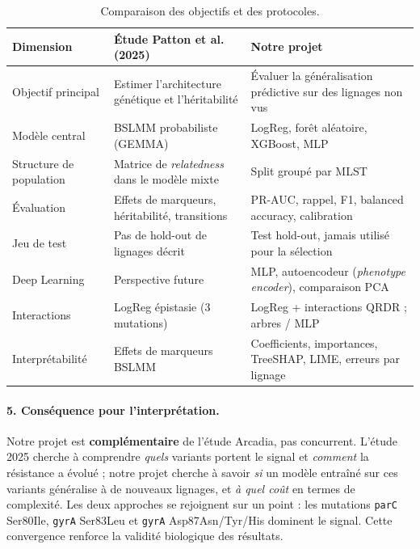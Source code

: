 \documentclass[11pt,a4paper]{article}
\begin{document}
\begin{table}[H]
\centering
\caption{Comparaison des objectifs et des protocoles.}
\label{tab:comparison_arcadia}
\small
\begin{tabularx}{\textwidth}{lXX}
\toprule
\textbf{Dimension} & \textbf{Étude Patton et al. (2025)} & \textbf{Notre projet} \\
\midrule
Objectif principal & Estimer l'architecture génétique et l'héritabilité & Évaluer la généralisation prédictive sur des lignages non vus \\
Modèle central & BSLMM probabiliste (GEMMA) & LogReg, forêt aléatoire, XGBoost, MLP \\
Structure de population & Matrice de \emph{relatedness} dans le modèle mixte & Split groupé par MLST \\
Évaluation & Effets de marqueurs, héritabilité, transitions & PR-AUC, rappel, F1, balanced accuracy, calibration \\
Jeu de test & Pas de hold-out de lignages décrit & Test hold-out, jamais utilisé pour la sélection \\
Deep Learning & Perspective future & MLP, autoencodeur (\emph{phenotype encoder}), comparaison PCA \\
Interactions & LogReg épistasie (3 mutations) & LogReg + interactions QRDR ; arbres / MLP \\
Interprétabilité & Effets de marqueurs BSLMM & Coefficients, importances, TreeSHAP, LIME, erreurs par lignage \\
\bottomrule
\end{tabularx}
\end{table}

\paragraph{5. Conséquence pour l'interprétation.}
Notre projet est \textbf{complémentaire} de l'étude Arcadia, pas concurrent. L'étude 2025 cherche à comprendre \emph{quels} variants portent le signal et \emph{comment} la résistance a évolué ; notre projet cherche à savoir \emph{si} un modèle entraîné sur ces variants généralise à de nouveaux lignages, et \emph{à quel coût} en termes de complexité. Les deux approches se rejoignent sur un point : les mutations \texttt{parC} Ser80Ile, \texttt{gyrA} Ser83Leu et \texttt{gyrA} Asp87Asn/Tyr/His dominent le signal. Cette convergence renforce la validité biologique des résultats.

\end{document}
